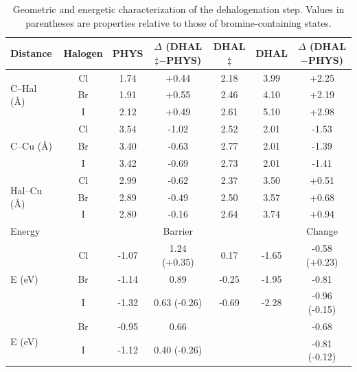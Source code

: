 \documentclass[%
 reprint,
 amsmath,amssymb,
 aps,
prb,
floatfix,
]{revtex4-2}
\begin{document}
\begin{table}
\centering
\begin{tabular}{ lcccccc  }
 \hline
 \hline
 Distance & Halogen & \textbf{PHYS} & $\Delta$ (\textbf{DHAL$\ddagger$}$-$\textbf{PHYS}) & \textbf{DHAL$\ddagger$} & \textbf{DHAL} & $\Delta$ (\textbf{DHAL}$-$\textbf{PHYS}) \\ 
 \hline 
 \multirow{3}{*}{C--Hal (\si{\angstrom})} & Cl & 1.74 & +0.44 & 2.18 & 3.99 & +2.25\\ 
 & Br & 1.91 & +0.55 & 2.46 & 4.10 &+2.19 \\ 
 & I & 2.12 & +0.49 & 2.61 & 5.10 &+2.98 \\ 
 \hline
 \multirow{3}{*}{C--Cu (\si{\angstrom}) } & Cl & 3.54 & -1.02 & 2.52 & 2.01 & -1.53\\ 
 & Br & 3.40 & -0.63 & 2.77 & 2.01 & -1.39\\ 
 & I &3.42 &-0.69 & 2.73 & 2.01 & -1.41\\ 
 \hline
 \multirow{3}{*}{Hal--Cu (\si{\angstrom}) } & Cl & 2.99 & -0.62 & 2.37 & 3.50 & +0.51\\ 
 & Br & 2.89 & -0.49 & 2.50 & 3.57 & +0.68\\ 
 & I &2.80 &-0.16 & 2.64& 3.74 & +0.94\\ 
 \hline
 \hline
 Energy & & & Barrier & & & Change \\
 \hline
 \multirow{3}{*}{E (\si{\electronvolt}) } & Cl & -1.07 & 1.24 (+0.35) &0.17 &-1.65 & -0.58 (+0.23)\\ 
 & Br &-1.14 & 0.89 &-0.25 & -1.95& -0.81\\ 
 & I  & -1.32 & 0.63 (-0.26) & -0.69& -2.28& -0.96 (-0.15) \\ 
 \hline
 \multirow{2}{*}{E (\si{\electronvolt})~\cite{jacs2013}} & Br &-0.95 & 0.66 & & & -0.68 \\ 
 & I & -1.12& 0.40 (-0.26) & & & -0.81 (-0.12) \\ 
 \hline
 \hline
\end{tabular}
\caption{Geometric and energetic characterization of the dehalogenation step. Values in parentheses are properties relative to those of bromine-containing states.}
\label{table:bondlength}
\end{table}
\end{document}
